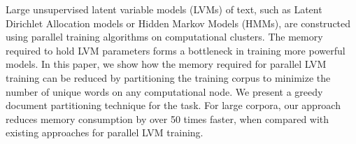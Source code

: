 Large unsupervised latent variable models (LVMs) of text, such as Latent Dirichlet Allocation models or Hidden Markov Models (HMMs), are constructed
 using parallel training algorithms on computational clusters. The memory
 required to hold LVM parameters forms a bottleneck in training more powerful
 models.  In this paper, we show how the memory required for parallel LVM
 training can be reduced by partitioning the training corpus to minimize the
 number of unique words on any computational node. We present a greedy
 document partitioning technique for the task. For large corpora, our approach
 reduces memory consumption by over 50%
 times faster, when compared with existing approaches for parallel LVM training.


